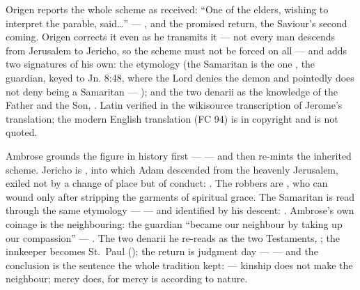 \begin{witnessnote}
Origen reports the whole scheme as received: ``One of the elders, wishing to
interpret the parable, said\dots'' --- , and the
promised return, the Saviour's second coming. Origen corrects it even as he
transmits it --- not every man descends from Jerusalem to Jericho, so the
scheme must not be forced on all --- and adds two signatures of his own: the
etymology (the Samaritan is the one , the
guardian, keyed to Jn. 8:48, where the Lord denies the demon and pointedly
does not deny being a Samaritan --- ); and the
two denarii as the knowledge of the Father and the Son, . Latin verified in the wikisource
transcription of Jerome's translation; the modern English translation (FC 94)
is in copyright and is not quoted.
\end{witnessnote}

\begin{witnessnote}
Ambrose grounds the figure in history first ---  --- and
then re-mints the inherited scheme. Jericho is ,
into which Adam descended from the heavenly Jerusalem, exiled not by a change
of place but of conduct: . The robbers are , who
can wound only after stripping the garments of spiritual grace. The Samaritan
is read through the same etymology ---  --- and identified by his descent: . Ambrose's own coinage is the neighbouring: the guardian ``became
our neighbour by taking up our compassion'' --- . The two
denarii he re-reads as the two Testaments, ; the innkeeper
becomes St.\ Paul (); the return is judgment day ---  --- and the conclusion is the sentence the whole tradition kept:
 --- kinship does not make the neighbour; mercy does, for
mercy is according to nature.
\end{witnessnote}

